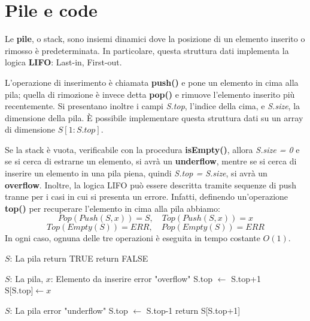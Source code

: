 \section{Pile e code}
Le \textbf{pile}, o stack, sono insiemi dinamici dove la posizione di un elemento inserito o rimosso è predeterminata. In particolare, questa struttura
dati implementa la logica \textbf{LIFO}: Last-in, First-out.\par
L'operazione di inserimento è chiamata \textbf{push()} e pone un elemento in cima alla pila; quella di rimozione è invece detta \textbf{pop()} e
rimuove l'elemento inserito più recentemente. Si presentano inoltre i campi \textit{S.top}, l'indice della cima, e \textit{S.size}, la dimensione della
pila. È possibile implementare questa struttura dati su un array di dimensione $S[1:S.top]$.\par
Se la stack è vuota, verificabile con la procedura \textbf{isEmpty()}, allora \textit{S.size = 0} e se si cerca di estrarne un elemento, si avrà un
\textbf{underflow}, mentre se si cerca di inserire un elemento in una pila piena, quindi \textit{S.top = S.size}, si avrà un \textbf{overflow}. Inoltre,
la logica LIFO può essere descritta tramite sequenze di push tranne per i casi in cui si presenta un errore. Infatti, definendo un'operazione
\textbf{top()} per recuperare l'elemento in cima alla pila abbiamo: \[
	Pop(Push(S,x)) = S,\quad Top(Push(S,x)) = x\] \[Top(Empty(S)) = ERR,\quad Pop(Empty(S)) = ERR
\]
\noindent In ogni caso, ognuna delle tre operazioni è eseguita in tempo costante $O(1)$.
\begin{algorithm}[h]
	\caption{isEmpty(S)}
	\begin{algorithmic}[i]
		\Require $S$: La pila
		\State return TRUE
		\EndIf
		\State return FALSE
	\end{algorithmic}
\end{algorithm}
\begin{algorithm}[h]
	\caption{push(S,x)}
	\begin{algorithmic}[i]
		\Require $S$: La pila, $x$: Elemento da inserire
		\State error "overflow"
		\Else S.top $\gets$ S.top+1
		\State $\text{S[S.top]}\gets x$
		\EndIf
	\end{algorithmic}
\end{algorithm}
\begin{algorithm}[h]
	\caption{pop(S)}
	\begin{algorithmic}[i]
		\Require $S$: La pila
		\State error "underflow"
		\Else S.top $\gets$ S.top-1
		\State return S[S.top+1]
		\EndIf
	\end{algorithmic}
\end{algorithm}

